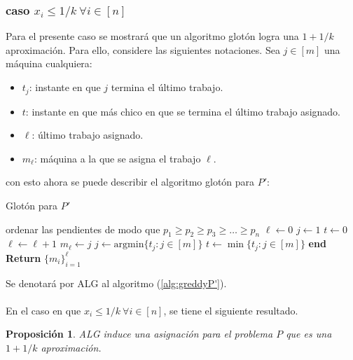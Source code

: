 \documentclass[10pt]{article}
\newcommand{\N}{\mathbb N}
\theoremstyle{plain}
\newtheorem{prop}{Proposición}
\theoremstyle{definition}
\begin{document}
\subsubsection{caso $x_i \leq 1/k \ \forall i \in [n]$}



Para el presente caso se mostrar\'a que un algoritmo glot\'on logra una $1+1/k$ aproximaci\'on. Para ello, considere las siguientes notaciones. Sea $j \in [m]$ una m\'aquina cualquiera:
\begin{itemize}
\item $t_j$: instante en que $j$ termina el \'ultimo trabajo.
\item $t$: instante en que m\'as chico en que se termina el \'ultimo trabajo asignado.
\item $\ell$: \'ultimo trabajo asignado.
\item $m_\ell$: m\'aquina a la que se asigna el trabajo $\ell$.
\end{itemize}
con esto ahora se puede describir el algoritmo glot\'on para $P'$:
\begin{algorithm}[H]
\caption{Glotón para $P'$}\label{alg:greddyP'}
\begin{algorithmic}[1]

\State ordenar las pendientes de modo que $p_1 \geq p_2 \geq p_3 \geq \ldots \geq p_n$  \;
\State $\ell \gets 0$\;
\State $j \gets 1$\;
\State $t \gets 0$\;
\State $\ell \gets \ell+1$\;
	\State $m_\ell \gets j$\;
	\State $j \gets \text{argmin}\{t_j: j \in [m]\}$\;
	\State $t \gets \min\{t_j: j \in [m]\}$\;
\EndWhile
\State \textbf{end}
\State \textbf{Return } $\{m_i\}_{i=1}^{\ell}$
\end{algorithmic}
\end{algorithm}
Se denotará por ALG al algoritmo (\ref{alg:greddyP'}).\\~\\
En el caso en que $x_i \leq 1/k\ \forall i \in [n]$, se tiene el siguiente resultado.
\begin{prop}
ALG induce una asignación para el problema $P$ que es una $1+1/k$ aproximación.
\end{prop}
\end{document}
